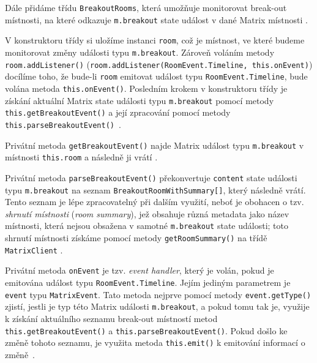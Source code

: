 Dále přidáme třídu \texttt{BreakoutRooms}, která umožňuje
monitorovat break-out místnosti, na které odkazuje \texttt{m.breakout}
state událost v dané Matrix místnosti \parencite{GitHub-MatrixJSSDK-BreakoutRooms}.

V konstruktoru třídy si uložíme instanci \texttt{room}, což je
místnost, ve které budeme monitorovat změny události typu
\texttt{m.breakout}. Zároveň voláním metody
\texttt{room.addListener()}
(\texttt{room.addListener(RoomEvent.Timeline, this.onEvent)})
docílíme toho, že bude-li \texttt{room} emitovat událost typu
\texttt{RoomEvent.Timeline}, bude volána metoda
\texttt{this.onEvent()}. Posledním krokem v konstruktoru třídy
je získání aktuální Matrix state události typu \texttt{m.breakout}
pomocí metody \texttt{this.getBreakoutEvent()} a její zpracování
pomocí metody
\texttt{this.parseBreakoutEvent()}~\parencite{GitHub-MatrixJSSDK-BreakoutRooms}.

Privátní metoda \texttt{getBreakoutEvent()} najde Matrix událost
typu \texttt{m.breakout} v místnosti
\texttt{this.room} a následně ji vrátí
\parencite{GitHub-MatrixJSSDK-BreakoutRooms}.

Privátní metoda \texttt{parseBreakoutEvent()} překonvertuje
\texttt{content} state události typu \texttt{m.breakout} na
seznam \texttt{BreakoutRoomWithSummary[]}, který následně vrátí.
Tento seznam je lépe zpracovatelný při dalším využití, neboť je obohacen o tzv.
\textit{shrnutí místnosti} (\textit{room summary}), jež obsahuje různá
metadata jako název místnosti, která nejsou obsažena v samotné
\texttt{m.breakout} state události; toto shrnutí místnosti získáme
pomocí metody \texttt{getRoomSummary()} na třídě
\texttt{MatrixClient} \parencite{GitHub-MatrixJSSDK-BreakoutRooms}.

Privátní metoda \texttt{onEvent} je tzv. \textit{event handler},
který je volán, pokud je emitována událost typu
\texttt{RoomEvent.Timeline}. Jejím jediným parametrem je
\texttt{event} typu \texttt{MatrixEvent}. Tato
metoda nejprve pomocí metody \texttt{event.getType()} zjistí,
jestli je typ této Matrix události \texttt{m.breakout}, a pokud tomu
tak je, využije k získání aktuálního seznamu break-out místností metod
\texttt{this.getBreakoutEvent()} a
\texttt{this.parseBreakoutEvent()}. Pokud došlo ke změně tohoto
seznamu, je využita metoda \texttt{this.emit()} k emitování
informací o změně~\parencite{GitHub-MatrixJSSDK-BreakoutRooms}.

